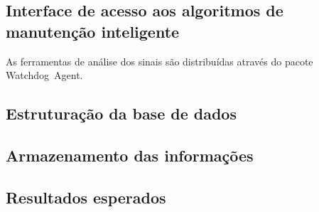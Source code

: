 \subsection{Interface de acesso aos algoritmos de manutenção inteligente}

As ferramentas de análise dos sinais são distribuídas através do pacote Watchdog~Agent.

\iffalse
Funcionalidade para carregar módulos de diagnóstico nos dispositivos. As ferramentas do Watchdog
poderiam ser estendidas e embarcadas em um arquivo JAR. As ferramentas poderiam ser enviadas para os
dispositivos através de serviços e utilizadas localmente, sem necessidade de acesso remoto ao
Watchdog Agent.
\fi


\subsection{Estruturação da base de dados}


\subsection{Armazenamento das informações}



\subsection{Resultados esperados}


\iffalse
Dados de treinamento e teste.
Definição de alarmes para alteração do valor de confiança.
\fi
